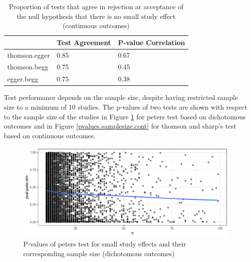 \documentclass[11pt,a4paper,twoside]{book}\usepackage[]{graphicx}\usepackage[]{color}
\makeatletter
\newenvironment{kframe}{%
 \def\at@end@of@kframe{}%
 \ifinner\ifhmode%
  \def\at@end@of@kframe{\end{minipage}}%
  \begin{minipage}{\columnwidth}%
 \fi\fi%
 \def\FrameCommand##1{\hskip\@totalleftmargin \hskip-\fboxsep
 \colorbox{shadecolor}{##1}\hskip-\fboxsep
     \hskip-\linewidth \hskip-\@totalleftmargin \hskip\columnwidth}%
 \MakeFramed {\advance\hsize-\width
   \@totalleftmargin\z@ \linewidth\hsize
   \@setminipage}}%
 {\par\unskip\endMakeFramed%
 \at@end@of@kframe}
\newenvironment{knitrout}{}{} %
\makeatother
\begin{document}
\begin{kframe}


{\ttfamily\noindent\color{warningcolor}{\#\# Warning: Setting row names on a tibble is deprecated.}}\end{kframe}%
\begin{table}[ht]
\centering
\begingroup\footnotesize
\begin{tabular}{lll}
  \hline
 & Test Agreement & P-value Correlation \\ 
  \hline
thomson.egger & 0.85 & 0.67 \\ 
  thomson.begg & 0.75 & 0.45 \\ 
  egger.begg & 0.75 & 0.38 \\ 
   \hline
\end{tabular}
\endgroup
\caption{Proportion of tests that agree in rejection ar acceptance of the null hypothesis that there is no small study effect (continuous outcomes)} 
\label{agreement.cont}
\end{table}


\vspace{0mm}
Test performance depends on the sample size, despite having restricted sample size to a minimum of 10 studies. The p-values of two tests are shown with respect to the sample size of the studies in Figure \ref{pvalues.samplesize.bin} for peters test based on dichotomous outcomes and in Figure \ref{pvalues.samplesize.cont} for thomson and sharp's test based on continuous outcomes. %

\begin{figure}
\begin{knitrout}
\color{fgcolor}

{\centering \includegraphics[width=\textwidth-3cm]{figure/ch02_figunnamed-chunk-22-1} 

}



\end{knitrout}
\caption{P-values of peters test for small study effects and their corresponding sample size (dichotomous outcomes)}
\label{pvalues.samplesize.bin}
\end{figure}
\end{document}
